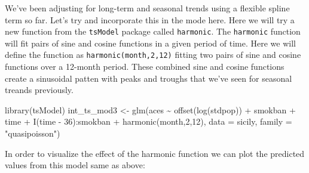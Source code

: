 \documentclass[
]{book}
\newenvironment{Shaded}{\begin{snugshade}}{\end{snugshade}}
\newcommand{\AttributeTok}[1]{\textcolor[rgb]{0.77,0.63,0.00}{#1}}
\newcommand{\DecValTok}[1]{\textcolor[rgb]{0.00,0.00,0.81}{#1}}
\newcommand{\FunctionTok}[1]{\textcolor[rgb]{0.00,0.00,0.00}{#1}}
\newcommand{\NormalTok}[1]{#1}
\newcommand{\OtherTok}[1]{\textcolor[rgb]{0.56,0.35,0.01}{#1}}
\newcommand{\SpecialCharTok}[1]{\textcolor[rgb]{0.00,0.00,0.00}{#1}}
\newcommand{\StringTok}[1]{\textcolor[rgb]{0.31,0.60,0.02}{#1}}
\begin{document}
We've been adjusting for long-term and seasonal trends using a flexible spline term so far. Let's try and incorporate this in the mode here. Here we will try a new function from the \texttt{tsModel} package called \texttt{harmonic}. The \texttt{harmonic} function will fit pairs of sine and cosine functions in a given period of time. Here we will define the function as \texttt{harmonic(month,2,12)} fitting two pairs of sine and cosine functions over a 12-month period. These combined sine and cosine functions create a sinusoidal patten with peaks and troughs that we've seen for seasonal treands previously.

\begin{Shaded}
\begin{Highlighting}[]
\FunctionTok{library}\NormalTok{(tsModel)}
\NormalTok{int\_ts\_mod3 }\OtherTok{\textless{}{-}} \FunctionTok{glm}\NormalTok{(aces }\SpecialCharTok{\textasciitilde{}} \FunctionTok{offset}\NormalTok{(}\FunctionTok{log}\NormalTok{(stdpop)) }\SpecialCharTok{+}\NormalTok{ smokban }\SpecialCharTok{+}\NormalTok{ time }\SpecialCharTok{+} 
                     \FunctionTok{I}\NormalTok{(time }\SpecialCharTok{{-}} \DecValTok{36}\NormalTok{)}\SpecialCharTok{:}\NormalTok{smokban }\SpecialCharTok{+} \FunctionTok{harmonic}\NormalTok{(month,}\DecValTok{2}\NormalTok{,}\DecValTok{12}\NormalTok{), }
                      \AttributeTok{data =}\NormalTok{ sicily, }
                      \AttributeTok{family =} \StringTok{"quasipoisson"}\NormalTok{)}
\end{Highlighting}
\end{Shaded}

In order to visualize the effect of the harmonic function we can plot the predicted values from this model same as above:
\end{document}
